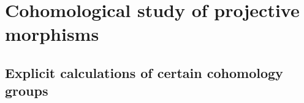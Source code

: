 \section{Cohomological study of projective morphisms}
\label{section:3.2}


\subsection{Explicit calculations of certain cohomology groups}
\label{subsection:3.2.1}










